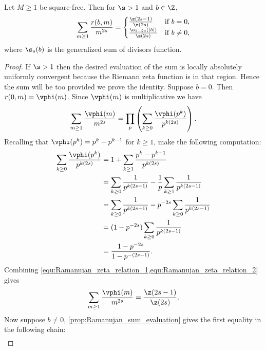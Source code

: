       \begin{lemma}\label{lem:Ramanujan_zeta_relation}
        Let $M \ge 1$ be square-free. Then for $\s > 1$ and $b \in \Z$,
        \[
          \sum_{m \ge 1}\frac{r(b,m)}{m^{2s}} = \begin{cases} \frac{\z(2s-1)}{\z(2s)} & \text{if $b = 0$}, \\ \frac{\s_{1-2s}(|b|)}{\z(2s)} & \text{if $b \neq 0$}, \end{cases}
        \]
        where $\s_{s}(b)$ is the generalized sum of divisors function.
      \end{lemma}
      \begin{proof}
        If $\s > 1$ then the desired evaluation of the sum is locally absolutely uniformly convergent because the Riemann zeta function is in that region. Hence the sum will be too provided we prove the identity. Suppose $b = 0$. Then $r(0,m) = \vphi(m)$. Since $\vphi(m)$ is multiplicative we have
        \begin{equation}\label{equ:Ramanujan_zeta_relation_1}
          \sum_{m \ge 1}\frac{\vphi(m)}{m^{2s}} = \prod_{p}\left(\sum_{k \ge 0}\frac{\vphi(p^{k})}{p^{k(2s)}}\right).
        \end{equation}
        Recalling that $\vphi(p^{k}) = p^{k}-p^{k-1}$ for $k \ge 1$, make the following computation:
        \begin{equation}\label{equ:Ramanujan_zeta_relation_2}
          \begin{aligned}
            \sum_{k \ge 0}\frac{\vphi(p^{k})}{p^{k(2s)}} &= 1+\sum_{k \ge 1}\frac{p^{k}-p^{k-1}}{p^{k(2s)}} \\
            &= \sum_{k \ge 0}\frac{1}{p^{k(2s-1)}}-\frac{1}{p}\sum_{k \ge 1}\frac{1}{p^{k(2s-1)}} \\
            &= \sum_{k \ge 0}\frac{1}{p^{k(2s-1)}}-p^{-2s}\sum_{k \ge 0}\frac{1}{p^{k(2s-1)}} \\
            &= (1-p^{-2s})\sum_{k \ge 0}\frac{1}{p^{k(2s-1)}} \\
            &= \frac{1-p^{-2s}}{1-p^{-(2s-1)}}.
          \end{aligned}
        \end{equation}
        Combining \cref{equ:Ramanujan_zeta_relation_1,equ:Ramanujan_zeta_relation_2} gives
        \[
          \sum_{m \ge 1}\frac{\vphi(m)}{m^{2s}} = \frac{\z(2s-1)}{\z(2s)}.
        \]
        Now suppose $b \neq 0$, \cref{prop:Ramanujan_sum_evaluation} gives the first equality in the following chain:
        \begin{align*}

\end{align*}
\end{proof}
